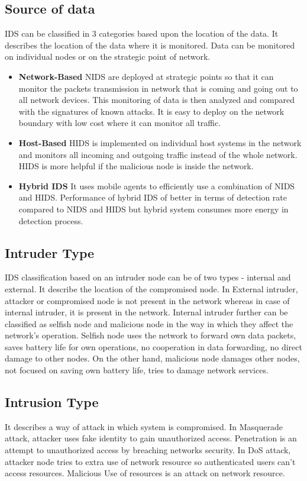 \subsection{Source of data}
IDS can be classified in 3 categories based upon the location of the data. It describes the location of the data where it is monitored. Data can be monitored on individual nodes or on the strategic point of network.
\begin{itemize}
    \item{\textbf{Network-Based} NIDS are deployed at strategic points so that it can monitor the packets transmission in network that is coming and going out to all network devices. This monitoring of data is then analyzed and compared with the signatures of known attacks. It is easy to deploy on the network boundary  with low cost where it can monitor all traffic.}
    \item{\textbf{Host-Based} HIDS is implemented on individual host systems in the network and monitors all incoming and outgoing traffic instead of the whole network. HIDS is more helpful if the malicious node is inside the network.}
    \item{\textbf{Hybrid IDS} It uses mobile agents to efficiently use a combination of NIDS and HIDS. Performance of hybrid IDS of better in terms of detection rate compared to NIDS and HIDS but hybrid system consumes more energy in detection process.}
\end{itemize}
\subsection{Intruder Type}
IDS classification based on  an intruder node can be of two types - internal and external. It describe the location of the compromised node. In External intruder, attacker or compromised node is not present in the network whereas in case of internal intruder, it is present in the network. Internal intruder further can be classified as selfish node and malicious node in the way in which they affect the network's operation. Selfish node uses the network to forward own data packets, saves battery life for own operations, no cooperation in data forwarding, no direct damage to other nodes. On the other hand, malicious node damages other nodes, not focused on saving own battery life, tries to damage network services.
\subsection{Intrusion Type}
It describes a way of attack in which system is compromised. In Masquerade attack, attacker uses fake identity to gain unauthorized access. Penetration is an attempt to unauthorized access by breaching networks security. In DoS attack, attacker node tries to extra use of network resource so authenticated users can’t access resources. Malicious Use of resources is an attack on network resource.

